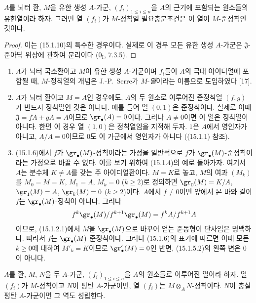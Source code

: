 \begin{corollary}[15.1.11]
\label{0.15.1.11-fr}
$A$를 뇌터 환, $M$을 유한 생성 $A$-가군,
$(f_i)_{1\leq i\leq n}$을 $A$의 근기에 포함되는 원소들의 유한열이라
하자. 그러면 열 $(f_i)$가 $M$-정칙일 필요충분조건은 이 열이
$M$-준정칙인 것이다.
\end{corollary}

\begin{proof}
이는 (15.1.10)의 특수한 경우이다. 실제로 이 경우 모든 유한 생성
$A$-가군은 $\mathfrak{J}$-준아딕 위상에 관하여 분리이다
($0_{\mathrm I}$, 7.3.5).
\end{proof}

\begin{remarks}[15.1.12]
\label{0.15.1.12-fr}
\mbox{}
\begin{enumerate}
  \item[(i)] $A$가 뇌터 국소환이고 $M$이 유한 생성 $A$-가군이며
  $f_i$들이 $A$의 극대 아이디얼에 포함될 때, $M$-정칙열의 개념은
  J.-P.~Serre가 $M$-\emph{열}이라는 이름으로 도입하였다 [17].
  \item[(ii)] $A$가 뇌터 환이고 $M=A$인 경우에도, $A$의 두 원소로
  이루어진 준정칙열 $(f,g)$가 반드시 정칙열인 것은 아니다. 예를 들어
  열 $(0,1)$은 준정칙이다. 실제로 이때
  $\mathfrak{J}=fA+gA=A$이므로 $\gr_\bullet(A)=0$이다. 그러나
  $A\neq0$이면 이 열은 정칙열이 아니다. 한편 이 경우 열 $(1,0)$은
  정칙열임을 지적해 두자. $1$은 $A$에서 영인자가 아니고, $A/A=0$이므로
  $0$도 이 가군에서 영인자가 아니다 ((15.1.1) 참조).
  \item[(iii)]
  (15.1.6)에서 $f$가 $\gr_\bullet(M)$-정칙이라는 가정을 일반적으로
  $f$가 $\gr_\bullet(M)$-준정칙이라는 가정으로 바꿀 수 없다. 이를
  보기 위하여 (15.1.4)의 예로 돌아가자. 여기서 $A$는 분수체
  $K\neq A$를 갖는 주 아이디얼환이다. $M=K$로 놓고, $M$의 여과
  $(M_k)$를 $M_0=M=K$, $M_1=A$, $M_k=0$ ($k\geq2$)로 정의하면
  $\gr_0(M)=K/A$, $\gr_1(M)=A$, $\gr_k(M)=0$ ($k\geq2$)이다.
  $A$에서 $f\neq0$이면 앞에서 본 바와 같이 $f$는
  $\gr_\bullet(M)$-정칙이 아니다. 그러나
  \[
    f^k\gr_\bullet(M)/f^{k+1}\gr_\bullet(M)=f^kA/f^{k+1}A
  \]
  이므로, (15.1.2.1)에서 $M$을 $\gr_\bullet(M)$으로 바꾸어 얻는
  준동형이 단사임은 명백하다. 따라서 $f$는
  $\gr_\bullet(M)$-준정칙이다. 그러나 (15.1.6)의 표기에 따르면 이때
  모든 $k\geq0$에 대하여 $M'_k=K$이므로 $\gr'_\bullet(M)=0$인 반면,
  (15.1.5.2)의 왼쪽 변은 $0$이 아니다.
\end{enumerate}
\end{remarks}


\begin{proposition}[15.1.13]
\label{0.15.1.13-fr}
$A$를 환, $M$, $N$을 두 $A$-가군, $(f_i)_{1\leq i\leq n}$을 $A$의
원소들로 이루어진 열이라 하자. 열 $(f_i)$가 $M$-정칙이고 $N$이 평탄
$A$-가군이면, 열 $(f_i)$는 $M\otimes_A N$-정칙이다. $N$이 충실 평탄
$A$-가군이면 그 역도 성립한다.
\end{proposition}

